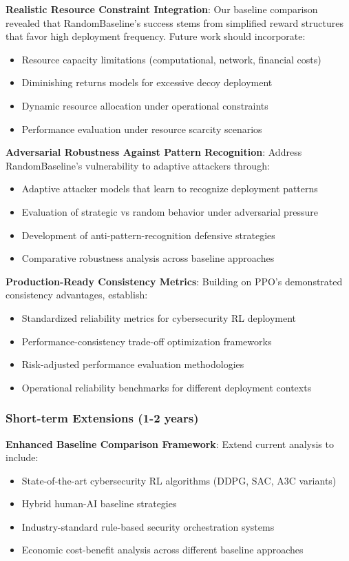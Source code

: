 \documentclass[12pt,twoside]{article}
\theoremstyle{definition}
\theoremstyle{plain}
\begin{document}
\textbf{Realistic Resource Constraint Integration}: Our baseline comparison revealed that RandomBaseline's success stems from simplified reward structures that favor high deployment frequency. Future work should incorporate:
\begin{itemize}
\item Resource capacity limitations (computational, network, financial costs)
\item Diminishing returns models for excessive decoy deployment
\item Dynamic resource allocation under operational constraints
\item Performance evaluation under resource scarcity scenarios
\end{itemize}

\textbf{Adversarial Robustness Against Pattern Recognition}: Address RandomBaseline's vulnerability to adaptive attackers through:
\begin{itemize}
\item Adaptive attacker models that learn to recognize deployment patterns
\item Evaluation of strategic vs random behavior under adversarial pressure
\item Development of anti-pattern-recognition defensive strategies
\item Comparative robustness analysis across baseline approaches
\end{itemize}

\textbf{Production-Ready Consistency Metrics}: Building on PPO's demonstrated consistency advantages, establish:
\begin{itemize}
\item Standardized reliability metrics for cybersecurity RL deployment
\item Performance-consistency trade-off optimization frameworks
\item Risk-adjusted performance evaluation methodologies
\item Operational reliability benchmarks for different deployment contexts
\end{itemize}

\subsubsection{Short-term Extensions (1-2 years)}

\textbf{Enhanced Baseline Comparison Framework}: Extend current analysis to include:
\begin{itemize}
\item State-of-the-art cybersecurity RL algorithms (DDPG, SAC, A3C variants)
\item Hybrid human-AI baseline strategies
\item Industry-standard rule-based security orchestration systems
\item Economic cost-benefit analysis across different baseline approaches
\end{itemize}
\end{document}
